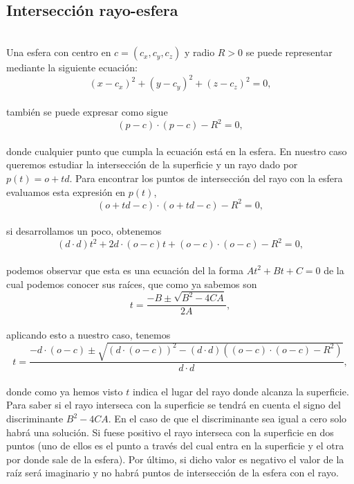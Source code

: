 ${ }$\\
\subsection{Intersección rayo-esfera}
${ }$\\

Una esfera con centro en $c = (c_x, c_y, c_z)$ y radio $R>0$ se puede representar mediante la siguiente ecuación:
${ }$\\
\[
	(x-c_x)^2 + (y-c_y)^2 + (z-c_z)^2 = 0,
\]
${ }$\\
también se puede expresar como sigue
${ }$\\
\[
	(p-c)\cdot(p-c) - R^2 = 0,
\]
${ }$\\
donde cualquier punto que cumpla la ecuación está en la esfera. En nuestro caso queremos estudiar la intersección de la superficie y un rayo dado por $p(t) = o + td$. Para encontrar los puntos de intersección del rayo con la esfera evaluamos esta expresión en $p(t)$,
${ }$\\
\[
	(o+td-c)\cdot(o+td-c) - R^2 = 0,
\]
${ }$\\
si desarrollamos un poco, obtenemos
${ }$\\
\[
	(d\cdot d)t^2 + 2d\cdot (o-c)t + (o-c)\cdot(o-c) - R^2 = 0,
\]
${ }$\\
podemos observar que esta es una ecuación del la forma $At^2+Bt+C=0$ de la cual podemos conocer sus raíces, que como ya sabemos son
${ }$\\
\[
	t = \frac{-B\pm \sqrt{B^2-4CA}}{2A},
\]
${ }$\\
aplicando esto a nuestro caso, tenemos
${ }$\\
\[
	t = \frac{-d\cdot (o-c) \pm \sqrt{(d\cdot (o-c))^2 - (d\cdot d)((o-c)\cdot(o-c)-R^2)}}{d\cdot d},
\]
${ }$\\
donde como ya hemos visto $t$ indica el lugar del rayo donde alcanza la superficie.
${ }$\\

Para saber si el rayo interseca con la superficie se tendrá en cuenta el signo del discriminante $B^2-4CA$. En el caso de que el discriminante sea igual a cero solo habrá una solución. Si fuese positivo el rayo interseca con la superficie en dos puntos (uno de ellos es el punto a través del cual entra en la superficie y el otra por donde sale de la esfera). Por último, si dicho valor es negativo el valor de la raíz será imaginario y no habrá puntos de intersección de la esfera con el rayo.
	${ }$\\	
	

